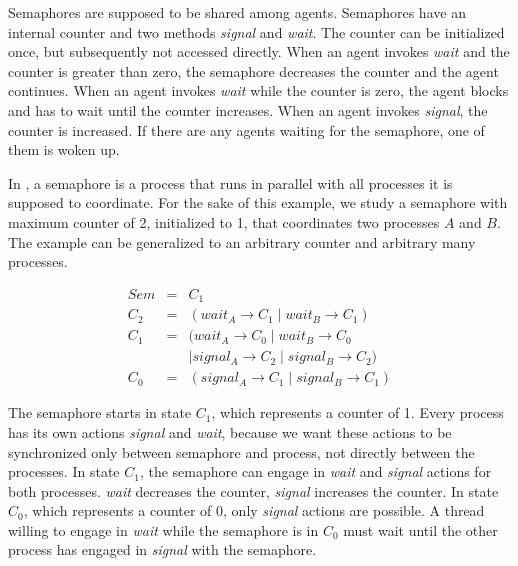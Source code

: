 Semaphores are supposed to be shared among agents.
Semaphores have an internal counter and two methods \emph{signal} and \emph{wait}.
The counter can be initialized once, but subsequently not accessed directly.
When an agent invokes \emph{wait} and the counter is greater than zero, the semaphore decreases the counter and the agent continues.
When an agent invokes \emph{wait} while the counter is zero, the agent blocks and has to wait until the counter increases.
When an agent invokes \emph{signal}, the counter is increased.
If there are any agents waiting for the semaphore, one of them is woken up.

In \CSP, a semaphore is a process that runs in parallel with all processes it is supposed to coordinate.
For the sake of this example, we study a semaphore with maximum counter of 2, initialized to 1, that coordinates two processes $A$ and $B$.
The example can be generalized to an arbitrary counter and arbitrary many processes.

\begin{equation*}
  \begin{array}{rcl}
  Sem & = & C_1 \\
  C_2 & = & (wait_A \to C_1 \mid wait_B \to C_1) \\
  C_1 & = & (wait_A \to C_0 \mid wait_B \to C_0 \\
      &   & \mid signal_A \to C_2 \mid signal_B \to C_2) \\
  C_0 & = & (signal_A \to C_1 \mid signal_B \to C_1)
  \end{array}
\end{equation*}

The semaphore starts in state $C_1$, which represents a counter of 1.
Every process has its own actions \emph{signal} and \emph{wait}, because we want these actions to be synchronized only between semaphore and process, not directly between the processes.
In state $C_1$, the semaphore can engage in \emph{wait} and \emph{signal} actions for both processes.
\emph{wait} decreases the counter, \emph{signal} increases the counter.
In state $C_0$, which represents a counter of 0, only \emph{signal} actions are possible.
A thread willing to engage in \emph{wait} while the semaphore is in $C_0$ must wait until the other process has engaged in \emph{signal} with the semaphore.


